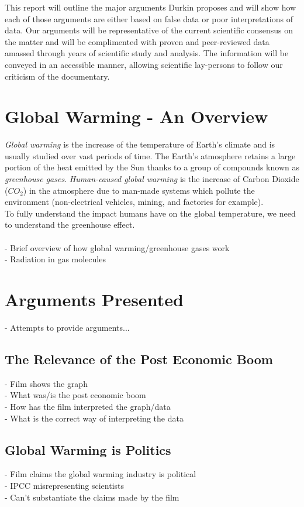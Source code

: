 \documentclass[12pt]{article}
\begin{document}
	This report will outline the major arguments Durkin proposes and will show how each of those arguments are either based on false data or poor interpretations of data. Our arguments will be representative of the current scientific consensus on the matter and will be complimented with proven and peer-reviewed data amassed through years of scientific study and analysis. The information will be conveyed in an accessible manner, allowing scientific lay-persons to follow our criticism of the documentary. \\

\section{Global Warming - An Overview}
	\textit{Global warming} is the increase of the temperature of Earth's climate and is usually studied over vast periods of time. The Earth's atmosphere retains a large portion of the heat emitted by the Sun thanks to a group of compounds known as \textit{greenhouse gases}. \textit{Human-caused global warming} is the increase of Carbon Dioxide ($CO_2$) in the atmosphere due to man-made systems which pollute the environment (non-electrical vehicles, mining, and factories for example). \\
	
	To fully understand the impact humans have on the global temperature, we need to understand the greenhouse effect. \\\\
	- Brief overview of how global warming/greenhouse gases work\\
	- Radiation in gas molecules\\
\section{Arguments Presented}
	- Attempts to provide arguments...\\
\subsection{The Relevance of the Post Economic Boom}
	- Film shows the graph\\
	- What was/is the post economic boom\\
	- How has the film interpreted the graph/data\\
	- What is the correct way of interpreting the data\\
\subsection{Global Warming is Politics}	
	- Film claims the global warming industry is political\\
	- IPCC misrepresenting scientists\\
	- Can't substantiate the claims made by the film\\
\end{document}
